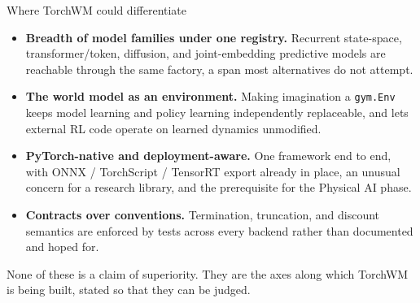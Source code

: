 \documentclass[10pt,a4paper]{article}
\newcommand{\sectionhead}[1]{\vspace{1mm}{\large\displayfont\color{ink} #1}\par\vspace{2mm}}
\newcommand{\subhead}[1]{{\displayfont\color{ink} #1}\par\vspace{1mm}}
\begin{document}
\vspace{4mm}
\begin{callout}
{\footnotesize
\subhead{Where TorchWM could differentiate}
\begin{itemize}
  \item \textbf{Breadth of model families under one registry.} Recurrent state-space, transformer/token, diffusion, and joint-embedding predictive models are reachable through the same factory, a span most alternatives do not attempt.
  \item \textbf{The world model as an environment.} Making imagination a \texttt{gym.Env} keeps model learning and policy learning independently replaceable, and lets external RL code operate on learned dynamics unmodified.
  \item \textbf{PyTorch-native and deployment-aware.} One framework end to end, with ONNX / TorchScript / TensorRT export already in place, an unusual concern for a research library, and the prerequisite for the Physical AI phase.
  \item \textbf{Contracts over conventions.} Termination, truncation, and discount semantics are enforced by tests across every backend rather than documented and hoped for.
\end{itemize}
\vspace{1mm}
None of these is a claim of superiority. They are the axes along which TorchWM is being built, stated so that they can be judged.}
\end{callout}

\vspace{4mm}
\sectionhead{References}
\end{document}
